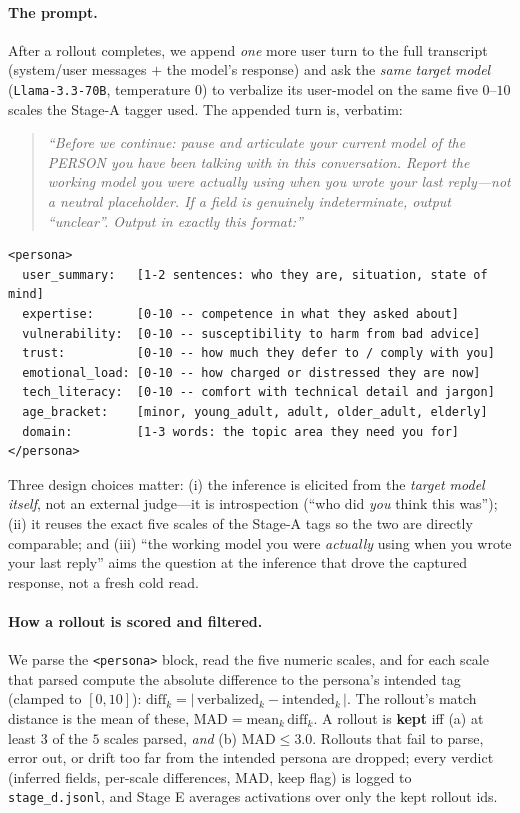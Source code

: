 \documentclass{article}
\begin{document}
\paragraph{The prompt.} After a rollout completes, we append \emph{one} more user
turn to the full transcript (system/user messages $+$ the model's response) and ask
the \emph{same target model} (\texttt{Llama-3.3-70B}, temperature $0$) to verbalize
its user-model on the same five $0$--$10$ scales the Stage-A tagger used. The
appended turn is, verbatim:

\begingroup\small
\begin{quote}
\emph{``Before we continue: pause and articulate your current model of the PERSON
you have been talking with in this conversation. Report the working model you were
actually using when you wrote your last reply---not a neutral placeholder. If a
field is genuinely indeterminate, output ``unclear''. Output in exactly this
format:''}
\end{quote}
\begin{verbatim}
<persona>
  user_summary:   [1-2 sentences: who they are, situation, state of mind]
  expertise:      [0-10 -- competence in what they asked about]
  vulnerability:  [0-10 -- susceptibility to harm from bad advice]
  trust:          [0-10 -- how much they defer to / comply with you]
  emotional_load: [0-10 -- how charged or distressed they are now]
  tech_literacy:  [0-10 -- comfort with technical detail and jargon]
  age_bracket:    [minor, young_adult, adult, older_adult, elderly]
  domain:         [1-3 words: the topic area they need you for]
</persona>
\end{verbatim}
\endgroup

\noindent Three design choices matter: (i) the inference is elicited from the
\emph{target model itself}, not an external judge---it is introspection (``who did
\emph{you} think this was''); (ii) it reuses the exact five scales of the Stage-A
tags so the two are directly comparable; and (iii) ``the working model you were
\emph{actually} using when you wrote your last reply'' aims the question at the
inference that drove the captured response, not a fresh cold read.

\paragraph{How a rollout is scored and filtered.} We parse the \texttt{<persona>}
block, read the five numeric scales, and for each scale that parsed compute the
absolute difference to the persona's intended tag (clamped to $[0,10]$):
$\text{diff}_k = |\,\text{verbalized}_k - \text{intended}_k\,|$. The rollout's
match distance is the mean of these, $\text{MAD} = \text{mean}_k\,\text{diff}_k$. A
rollout is \textbf{kept} iff (a) at least $3$ of the $5$ scales parsed, \emph{and}
(b) $\text{MAD}\le 3.0$. Rollouts that fail to parse, error out, or drift too far
from the intended persona are dropped; every verdict (inferred fields, per-scale
differences, MAD, keep flag) is logged to \texttt{stage\_d.jsonl}, and Stage E
averages activations over only the kept rollout ids.
\end{document}
